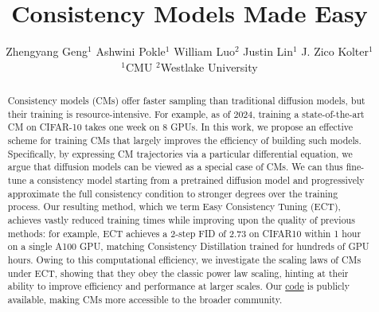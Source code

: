 \documentclass{article}
\title{Consistency Models Made Easy}
\author{%
    Zhengyang Geng$^1$
    \And
    Ashwini Pokle$^1$
    \And
    William Luo$^2$
    \And
    Justin Lin$^1$
    \And
    J. Zico Kolter$^1$
    \And
    \vspace{-0.4cm} \\
    $^1$CMU \quad $^2$Westlake University
}
\begin{document}
\maketitle

\begin{abstract}

Consistency models (CMs) offer faster sampling than traditional diffusion models, but their training is resource-intensive. For example, as of 2024, training a state-of-the-art CM on CIFAR-10 takes one week on 8 GPUs. In this work, we propose an effective scheme for training CMs that largely improves the efficiency of building such models. Specifically, by expressing CM trajectories via a particular differential equation, we argue that diffusion models can be viewed as a special case of CMs. We can thus fine-tune a consistency model starting from a pretrained diffusion model and progressively approximate the full consistency condition to stronger degrees over the training process. Our resulting method, which we term Easy Consistency Tuning (ECT), achieves vastly reduced training times while improving upon the quality of previous methods: for example, ECT achieves a 2-step FID of 2.73 on CIFAR10 within 1 hour on a single A100 GPU, matching Consistency Distillation trained for hundreds of GPU hours. Owing to this computational efficiency, we investigate the scaling laws of CMs under ECT, showing that they obey the classic power law scaling, hinting at their ability to improve efficiency and performance at larger scales. Our \href{https://github.com/locuslab/ect}{code} is publicly available, making CMs more accessible to the broader community.

\end{abstract}
\end{document}
